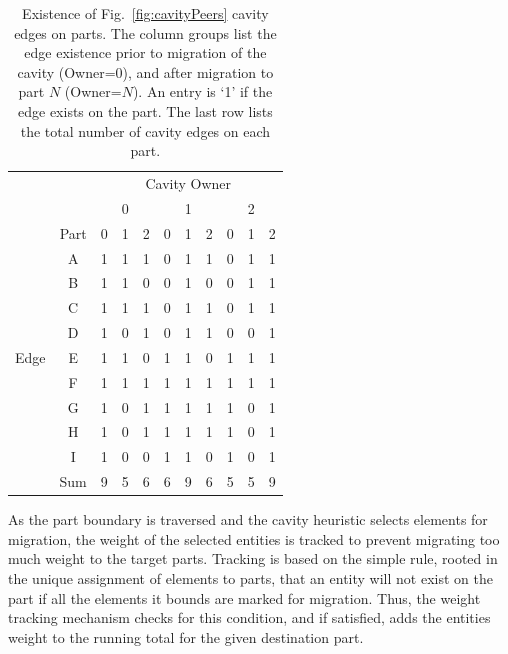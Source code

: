 \begin{table} \centering
  \footnotesize
  \caption[Existence of Fig.~\ref{fig:cavityPeers} cavity edges on parts.]{
    Existence of Fig.~\ref{fig:cavityPeers} cavity edges on parts.
    The column groups list the edge existence prior to migration of the cavity
    (Owner=0), and after migration to part $N$ (Owner=$N$).
    An entry is `1' if the edge exists on the part.  The last row
    lists the total number of cavity edges on each part.
  }
  \label{tbl:cavityPeerEnts}
  \begin{tabular}{cc|ccc|ccc|ccc}
            & & \multicolumn{9}{c}{Cavity Owner} \\
            &  & \multicolumn{3}{c|}{0}
            & \multicolumn{3}{c|}{1}
            & \multicolumn{3}{c}{2} \\
    \hline
           & Part & 0 & 1 & 2 & 0 & 1 & 2 & 0 & 1 & 2\\
    \hline
           & A    & 1 & 1 & 1 & 0 & 1 & 1 & 0 & 1 & 1 \\
           & B    & 1 & 1 & 0 & 0 & 1 & 0 & 0 & 1 & 1 \\
           & C    & 1 & 1 & 1 & 0 & 1 & 1 & 0 & 1 & 1 \\
           & D    & 1 & 0 & 1 & 0 & 1 & 1 & 0 & 0 & 1 \\
    Edge   & E    & 1 & 1 & 0 & 1 & 1 & 0 & 1 & 1 & 1 \\
           & F    & 1 & 1 & 1 & 1 & 1 & 1 & 1 & 1 & 1 \\
           & G    & 1 & 0 & 1 & 1 & 1 & 1 & 1 & 0 & 1 \\
           & H    & 1 & 0 & 1 & 1 & 1 & 1 & 1 & 0 & 1 \\
           & I    & 1 & 0 & 0 & 1 & 1 & 0 & 1 & 0 & 1 \\
    \hline
           & Sum  & 9 & 5 & 6 & 6 & 9 & 6 & 5 & 5 & 9 \\
  \end{tabular}
\end{table}

As the part boundary is traversed and the cavity heuristic selects elements for
migration, the weight of the selected entities is tracked to prevent migrating too
much weight to the target parts.
Tracking is based on the simple rule, rooted in the unique assignment of
elements to parts, that an entity will not exist on the part if all the elements
it bounds are marked for migration.
Thus, the weight tracking mechanism checks for this condition, and if satisfied,
adds the entities weight to the running total for the given destination part.

